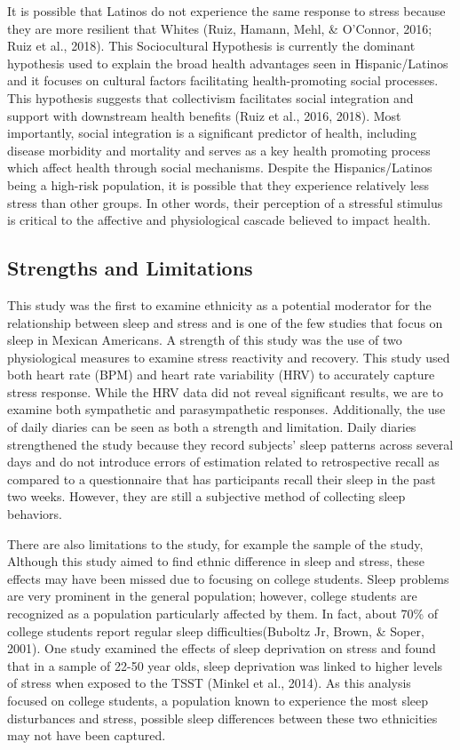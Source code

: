 \documentclass[man, fleqn, noextraspace]{apa6}
\begin{document}
It is possible that Latinos do not experience the same response to stress because they are more resilient that Whites (Ruiz, Hamann, Mehl, \& O'Connor, 2016; Ruiz et al., 2018). This Sociocultural Hypothesis is currently the dominant hypothesis used to explain the broad health advantages seen in Hispanic/Latinos and it focuses on cultural factors facilitating health-promoting social processes. This hypothesis suggests that collectivism facilitates social integration and support with downstream health benefits (Ruiz et al., 2016, 2018). Most importantly, social integration is a significant predictor of health, including disease morbidity and mortality and serves as a key health promoting process which affect health through social mechanisms. Despite the Hispanics/Latinos being a high-risk population, it is possible that they experience relatively less stress than other groups. In other words, their perception of a stressful stimulus is critical to the affective and physiological cascade believed to impact health.

\hypertarget{strengths-and-limitations}{%
\subsection{Strengths and Limitations}\label{strengths-and-limitations}}

This study was the first to examine ethnicity as a potential moderator for the relationship between sleep and stress and is one of the few studies that focus on sleep in Mexican Americans. A strength of this study was the use of two physiological measures to examine stress reactivity and recovery. This study used both heart rate (BPM) and heart rate variability (HRV) to accurately capture stress response. While the HRV data did not reveal significant results, we are to examine both sympathetic and parasympathetic responses. Additionally, the use of daily diaries can be seen as both a strength and limitation. Daily diaries strengthened the study because they record subjects' sleep patterns across several days and do not introduce errors of estimation related to retrospective recall as compared to a questionnaire that has participants recall their sleep in the past two weeks. However, they are still a subjective method of collecting sleep behaviors.

There are also limitations to the study, for example the sample of the study, Although this study aimed to find ethnic difference in sleep and stress, these effects may have been missed due to focusing on college students. Sleep problems are very prominent in the general population; however, college students are recognized as a population particularly affected by them. In fact, about 70\% of college students report regular sleep difficulties(Buboltz Jr, Brown, \& Soper, 2001). One study examined the effects of sleep deprivation on stress and found that in a sample of 22-50 year olds, sleep deprivation was linked to higher levels of stress when exposed to the TSST (Minkel et al., 2014). As this analysis focused on college students, a population known to experience the most sleep disturbances and stress, possible sleep differences between these two ethnicities may not have been captured.
\end{document}
